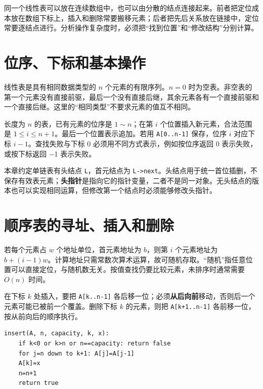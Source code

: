 同一个线性表可以放在连续数组中，也可以由分散的结点连接起来。前者把定位成本放在数组下标上，插入和删除常要搬移元素；后者把先后关系放在链接中，定位常要逐结点进行。分析操作复杂度时，必须把``找到位置''和``修改结构''分别计算。

\section{位序、下标和基本操作}\label{ds-02-01}

线性表是具有相同数据类型的 \(n\) 个元素的有限序列。\(n=0\) 时为空表。非空表的第一个元素没有直接前驱，最后一个没有直接后继，其余元素各有一个直接前驱和一个直接后继。这里的``相同类型''不要求元素的值互不相同。

长度为 \(n\) 的表，已有元素的位序是 \(1\sim n\)；在第 \(i\) 个位置插入新元素，合法范围是 \(1\le i\le n+1\)。最后一个位置表示追加。若用 \texttt{A{[}0..n-1{]}} 保存，位序 \(i\) 对应下标 \(i-1\)。查找失败与下标 0 必须用不同方式表示，例如按位序返回 0 表示失败，或按下标返回 −1 表示失败。

本章约定单链表有头结点 \texttt{L}，首元结点为 \texttt{L-\textgreater{}next}。头结点用于统一首位插删，不保存有效表元素；\textbf{头指针}是指向它的指针变量，二者不是同一对象。无头结点的版本也可以实现相同运算，但修改第一个结点时必须能够修改头指针。

\section{顺序表的寻址、插入和删除}\label{ds-02-02}

若每个元素占 \(w\) 个地址单位，首元素地址为 \(b\)，则第 \(i\) 个元素地址为 \(b+(i-1)w\)。计算地址只需常数次算术运算，故可随机存取。``随机''指任意位置可以直接定位，与随机数无关。按值查找仍要比较元素，未排序时通常需要 \(O(n)\) 时间。

在下标 \(k\) 处插入，要把 \texttt{A{[}k..n-1{]}} 各后移一位；必须\textbf{从后向前}移动，否则后一个元素可能已被前一个覆盖。删除下标 \(k\) 的元素，则把 \texttt{A{[}k+1..n-1{]}} 各前移一位，按从前向后的顺序执行。

\par\medskip\noindent
\begin{minipage}{\linewidth}
\begin{verbatim}
insert(A, n, capacity, k, x):
    if k<0 or k>n or n==capacity: return false
    for j=n down to k+1: A[j]=A[j-1]
    A[k]=x
    n=n+1
    return true
\end{verbatim}
\end{minipage}\par\medskip


